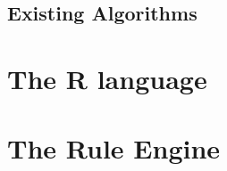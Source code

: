 \subsection{Existing Algorithms}
\label{sec:algorithms}

\section{The R language}
\section{The Rule Engine}